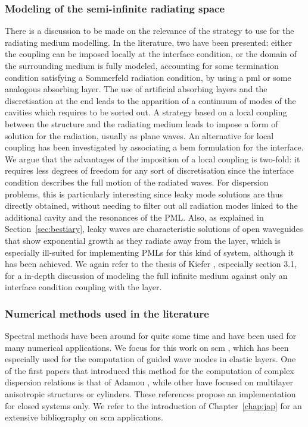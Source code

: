 \subsubsection{Modeling of the semi-infinite radiating space}
There is a discussion to be made on the relevance of the strategy to use for the radiating medium modelling. In the literature, two have been presented: either the coupling can be imposed locally at the interface condition, or the domain of the surrounding medium is fully modeled, accounting for some termination condition satisfying a Sommerfeld radiation condition, by using a \acrfull{pml} or some analogous absorbing layer. The use of artificial absorbing layers and the discretisation at the end leads to the apparition of a continuum of modes of the cavities \cite{gallezot2017} which requires to be sorted out. A strategy based on a local coupling between the structure and the radiating medium leads to impose a form of solution for the radiation, usually as plane waves\cite{kiefer2019}. An alternative for local coupling has been investigated by associating a \acrfull{bem} formulation for the interface\cite{mazzotti2013}. \\

We argue that the advantages of the imposition of a local coupling is two-fold: it requires less degrees of freedom for any sort of discretisation since the interface condition describes the full motion of the radiated waves. For dispersion problems, this is particularly interesting since leaky mode solutions are thus directly obtained, without needing to filter out all radiation modes linked to the additional cavity and the resonances of the PML. Also, as explained in Section~\ref{sec:bestiary}, leaky waves are characteristic solutions of open waveguides that show exponential growth as they radiate away from the layer, which is especially ill-suited for implementing PMLs for this kind of system, although it has been achieved\cite{zuo2017, gallezot2017}. We again refer to the thesis of Kiefer \cite{kiefer2022}, especially section 3.1, for a in-depth discussion of modeling the full infinite medium against only an interface condition coupling with the layer.

\subsubsection{Numerical methods used in the literature}
Spectral methods have been around for quite some time and have been used for many numerical applications. We focus for this work on \acrfull{scm} \cite{trefethen2000}, which has been especially used for the computation of guided wave modes in elastic layers. One of the first papers that introduced this method for the computation of complex dispersion relations is that of Adamou \etal \cite{adamou2004}, while other have focused on multilayer anisotropic structures \cite{quintanilla2015} or cylinders\cite{karpfinger2008}. These references propose an implementation for closed systems only. We refer to the introduction of Chapter~\ref{chap:jap} for an extensive bibliography on \acrshort{scm} applications. \\

